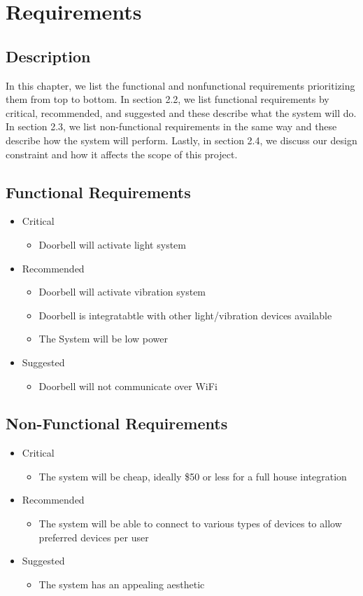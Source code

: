 \chapter{Requirements}

\section{Description}
In this chapter, we list the functional and nonfunctional requirements prioritizing them from top to bottom. In section 2.2, we list functional requirements by critical, recommended, and suggested and these describe what the system will do. In section 2.3, we list non-functional requirements in the same way and these describe how the system will perform. Lastly, in section 2.4, we discuss our design constraint and how it affects the scope of this project.

\section{Functional Requirements}
\begin{itemize} 
\item Critical
	\begin{itemize} 
	\item Doorbell will activate light system
	\end{itemize}
\item Recommended
	\begin{itemize} 
	\item Doorbell will activate vibration system
	\item Doorbell is integratabtle with other light/vibration devices available
	\item The System will be low power
	\end{itemize}
\item Suggested
	\begin{itemize} 
	\item Doorbell will not communicate over WiFi
	\end{itemize}
\end{itemize}
\section{Non-Functional Requirements}
\begin{itemize} 
\item Critical
	\begin{itemize} 
	\item The system will be cheap, ideally \$50 or less for a full house integration
	\end{itemize}
\item Recommended
	\begin{itemize} 
	\item The system will be able to connect to various types of devices to allow preferred devices per user
	\end{itemize}
\item Suggested
	\begin{itemize} 
	\item The system has an appealing aesthetic
	\end{itemize}
\end{itemize}
